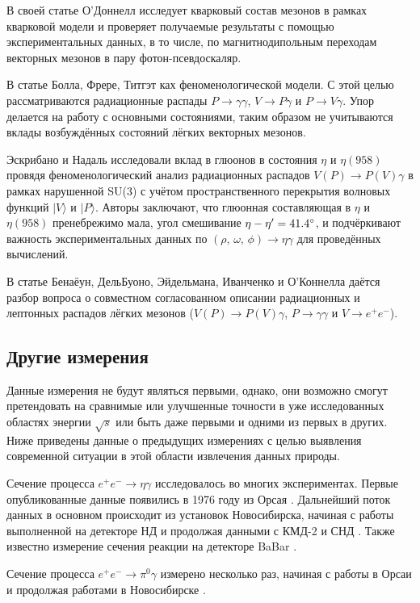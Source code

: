 В своей статье О'Доннелл \cite{ODonnell:1981sj} исследует кварковый состав мезонов в
рамках кварковой модели и проверяет получаемые результаты с помощью
экспериментальных данных, в то числе, по магнитнодипольным переходам
векторных мезонов в пару фотон-псевдоскаляр.

В статье Болла, Фрере, Титгэт \cite{Ball:1995zv} ках феноменологической модели.%
С этой целью рассматриваются радиационные распады
$P \to \gamma \gamma$, $V \to P \gamma$ и $P \to V \gamma$. Упор
делается на работу с основными состояниями, таким образом не учитываются
вклады возбуждённых состояний лёгких векторных мезонов.

Эскрибано и Надаль \cite{Escribano:2007cd} исследовали вклад в глюонов в состояния $\eta$
и $\eta(958)$ провядя феноменологический анализ радиационных распадов
$V (P) \to P (V) \gamma$ в рамках нарушенной SU(3) с учётом
пространственного перекрытия волновых функций $| V \rangle$ и
$|P \rangle$. Авторы заключают, что глюонная составляющая в $\eta$ и
$\eta(958)$ пренебрежимо мала, угол смешивание
$\eta-\eta^\prime = \ang{41.4 \pm 1.3}$, и подчёркивают важность
экспериментальных данных по $(\rho, \, \omega, \, \phi ) \to \eta \gamma$ для
проведённых вычислений.

В статье Бенаёун, ДельБуоно, Эйдельмана, Иванченко и О'Коннелла \cite{Benayoun:1999fv} даётся разбор
вопроса о совместном согласованном описании радиационных и лептонных
распадов лёгких мезонов ($V(P) \to P(V)\gamma$, $P \to \gamma \gamma$ и
$V \to e^+ e^-$).


\subsection{Другие измерения}\label{other-measurments}

Данные измерения не будут являться первыми, однако, они возможно смогут
претендовать на сравнимые или улучшенные точности в уже исследованных
областях энергии $\sqrt{s}$ или быть даже первыми и одними из первых в
других. Ниже приведены данные о предыдущих измерениях с целью выявления
современной ситуации в этой области извлечения данных природы.

Сечение процесса $e^+e^-\to\eta\gamma$ исследовалось во многих экспериментах.
Первые опубликованные данные появились в 1976 году из Орсая \cite{Cosme:1975rs}.
Дальнейший поток данных в основном происходит из установок Новосибирска, начиная с работы выполненной на детекторе НД \cite{Druzhinin:1984zq} и продолжая данными с КМД-2 \cite{Akhmetshin:1995vz, Akhmetshin:1999zv, Akhmetshin:2001hm, Akhmetshin:2004gw} и СНД \cite{Achasov:1997nq, Achasov:2000zd, Achasov:2006dv, Achasov:2013eli}.
Также известно измерение сечения реакции на детекторе BaBar \cite{Aubert:2006cy}.

Сечение процесса $e^+e^-\to\pi^0\gamma$ измерено несколько раз, начиная с работы в Орсаи \cite{Cosme:1975rs} и продолжая работами в Новосибирске \cite{Druzhinin:1984zq, Achasov:2000zd, Achasov:2003ed, Akhmetshin:2004gw, Achasov:2016bfr}.
